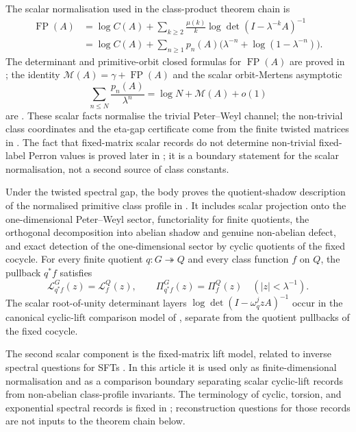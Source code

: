 \documentclass[11pt,a4paper]{amsart}
\theoremstyle{plain}
\theoremstyle{definition}
\theoremstyle{remark}
\DeclareMathOperator{\FP}{FP}
\begin{document}
The scalar normalisation used in the class-product theorem chain is
\begin{align*}
  \FP(A)
  &=\log C(A)
    +\sum_{k\ge 2}\frac{\mu(k)}{k}
      \log\det(I-\lambda^{-k}A)^{-1}\\
  &=\log C(A)
    +\sum_{n\ge 1}p_n(A)
      \bigl(\lambda^{-n}+\log(1-\lambda^{-n})\bigr).
\end{align*}
The determinant and primitive-orbit closed formulas for \(\FP(A)\) are proved
in ; the identity
\(\mathcal M(A)=\gamma+\FP(A)\) and the scalar orbit-Mertens asymptotic
\[
  \sum_{n\le N}\frac{p_n(A)}{\lambda^n}
  =\log N+\mathcal M(A)+o(1)
\]
are .  These scalar facts normalise
the trivial Peter--Weyl channel; the non-trivial class coordinates and the
eta-gap certificate come from the finite twisted matrices in
.
The fact that fixed-matrix scalar records do not determine non-trivial
fixed-label Perron values is proved later in
;
it is a boundary statement for the scalar normalisation, not a second source
of class constants.

Under the twisted spectral gap, the body proves the quotient-shadow description
of the normalised primitive class profile in
.
It includes scalar projection onto the one-dimensional Peter--Weyl sector,
functoriality for finite quotients, the orthogonal decomposition into abelian
shadow and genuine non-abelian defect, and exact detection of the
one-dimensional sector by cyclic quotients of the fixed cocycle.  For every
finite quotient \(q:G\twoheadrightarrow Q\) and every class function \(f\) on
\(Q\), the pullback \(q^\ast f\) satisfies
\[
  \mathcal L^G_{q^\ast f}(z)=\mathcal L^Q_f(z),
  \qquad
  \Pi^G_{q^\ast f}(z)=\Pi^Q_f(z)
  \quad(|z|<\lambda^{-1}).
\]
The scalar root-of-unity determinant layers
\(\log\det(I-\omega_q^jzA)^{-1}\) occur in the canonical cyclic-lift comparison
model of
,
separate from the quotient pullbacks of the fixed cocycle.

The second scalar component is the fixed-matrix lift model, related to inverse
spectral questions for SFTs \cite{LindMarcus1995}.  In this article it is used
only as finite-dimensional normalisation and as a comparison boundary separating
scalar cyclic-lift records from non-abelian class-profile invariants.  The
terminology of cyclic, torsion, and exponential spectral records is fixed in
; reconstruction questions for those records
are not inputs to the theorem chain below.
\end{document}
